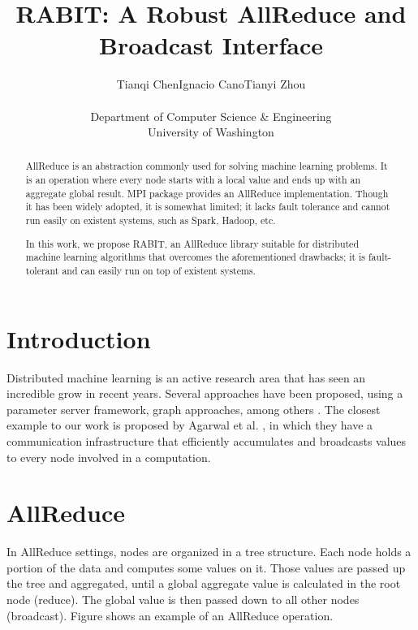 \documentclass[10pt,twocolumn]{article}
\newcommand{\todo}[1]{\noindent{\textcolor{red}{\{{\bf TODO:}  #1\}}}}
\begin{document}
\title{\bf RABIT: A Robust AllReduce and Broadcast Interface}
\author{Tianqi Chen\hspace{0.5in}Ignacio Cano\hspace{0.5in}Tianyi Zhou \\\\
Department of Computer Science \& Engineering \\
University of Washington\\
}
\date{}
\maketitle
\thispagestyle{empty}

\begin{abstract}

AllReduce is an abstraction commonly used for solving machine learning problems. It is an operation where every node starts with a local value and ends up with an aggregate global result.
MPI package provides an AllReduce implementation. Though it has been widely adopted, it is somewhat limited; it lacks fault tolerance and cannot run easily on existent systems, such as Spark, Hadoop, etc.

In this work, we propose RABIT, an AllReduce library suitable for distributed machine learning algorithms that overcomes the aforementioned drawbacks; it is fault-tolerant and can easily run on top of existent systems.

\end{abstract}

\section{Introduction}
Distributed machine learning is an active research area that has seen an incredible grow in recent years. Several approaches have been proposed, using a parameter server framework, graph approaches, among others \cite{paramServer,DuchiAW12,Zinkevich,Dekel,Low}. The closest example to our work is proposed by Agarwal et al. \cite{Agarwal}, in which they have a  communication infrastructure that efficiently accumulates and broadcasts values to every node involved in a computation.
\todo {add more stuff}


\section{AllReduce}

In AllReduce settings, nodes are organized in a tree structure. Each node holds a portion of the data and computes some values on it. Those values are passed up the tree and aggregated, until a global aggregate value is calculated in the root node (reduce). The global value is then passed down to all other nodes (broadcast). Figure \todo{add image} shows an example of an AllReduce operation.
\end{document}
